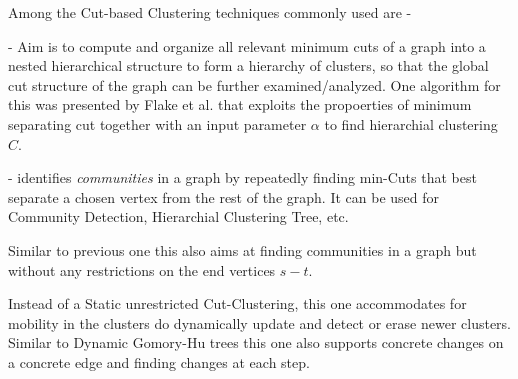     \noindent Among the Cut-based Clustering techniques commonly used are - 
    
    \vspace{2mm}
     - Aim is to compute and organize all relevant minimum cuts of a graph into a nested hierarchical structure to form a hierarchy of clusters, so that the global cut structure of the graph can be further examined/analyzed. One algorithm for this was presented by Flake et al. that exploits the propoerties of minimum separating cut together with an input parameter $\alpha$ to find hierarchial clustering $C$.

    \vspace{5mm}
     - identifies \textit{communities} in a graph by repeatedly finding min-Cuts that best separate a chosen vertex from the rest of the graph. It can be used for Community Detection, Hierarchial Clustering Tree, etc.

    \vspace{5mm}
     Similar to previous one this also aims at finding communities in a graph but without any restrictions on the end vertices $s-t$.

    \vspace{5mm}
     Instead of a Static unrestricted Cut-Clustering, this one accommodates for mobility in the clusters do dynamically update and detect or erase newer clusters. Similar to Dynamic Gomory-Hu trees this one also supports concrete changes on a concrete edge and finding changes at each step.

